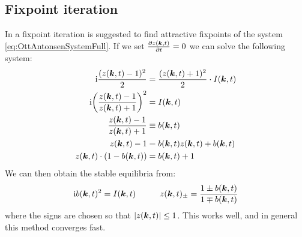 \subsection{Fixpoint iteration}
In \cite{OttAntonsen2017} a fixpoint iteration is suggested to find attractive fixpoints of the system \eqref{eq:OttAntonsenSystemFull}. If we set $\frac{\partial z({\boldsymbol{k}}, t)}{\partial t} = 0$ we can solve the following system:
\begin{align}
\ic \frac{(z(\k, t)-1)^{2}}{2} &= \frac{(z(\k, t)+1)^{2}}{2} \cdot I(\k, t) \nonumber \\
\ic \left(\frac{z(\k, t)-1}{z(\k, t)+1}\right)^2 &= I(\k, t) \nonumber \\
\frac{z(\k, t)-1}{z(\k, t)+1} &\equiv b(\k,t) \nonumber \\
z(\k, t) - 1 &= b(\k,t) z(\k, t) + b(\k,t)  \nonumber \\
z(\k, t) \cdot (1 - b(\k,t)) &= b(\k,t)  + 1\nonumber
\end{align}
We can then obtain the stable equilibria from:
\begin{align}
\ic b(\k,t)^2 = I(\k, t) \hspace{10mm} z(\k, t)_{\pm} = \frac{1 \pm b(\k,t)}{1 \mp b(\k,t)} \label{eq:fixedpointiterations} 
\end{align}
where the signs are chosen so that $\vert z({\boldsymbol{k}}, t) \vert \leq 1$. This works well, and in general this method converges fast.


